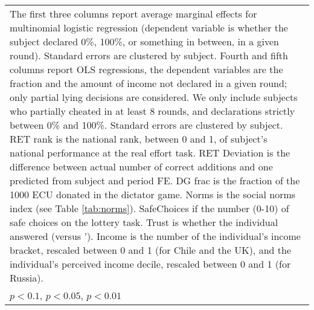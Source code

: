\begin{tabular}{l|cccccc|cc|cc}
\multicolumn{11}{p{18cm}}{\tiny The first three columns report average marginal effects for multinomial logistic regression (dependent variable is whether the subject declared 0\%, 100\%, or something in between, in a given round). Standard errors are clustered by subject. Fourth and fifth columns report OLS regressions, the dependent variables are the fraction and the amount of income not declared in a given round; only partial lying decisions are considered. We only include subjects who partially cheated in at least 8 rounds, and declarations strictly between 0\% and 100\%. Standard errors are clustered by subject. RET rank is the national rank, between 0 and 1, of subject's national performance at the real effort task. RET Deviation is the difference between actual number of correct additions and one predicted from subject and period FE. DG frac is the fraction of the 1000 ECU donated in the dictator game. Norms is the social norms index (see Table \ref{tab:norms}). SafeChoices if the number (0-10) of safe choices on the lottery task. Trust is whether the individual answered  (versus '). Income is the number of the individual's income bracket, rescaled between 0 and 1 (for Chile and the UK), and the individual's perceived income decile, rescaled between 0 and 1 (for Russia).}\\
\multicolumn{11}{l}{\tiny \sym{*} \(p<0.1\), \sym{**} \(p<0.05\), \sym{***} \(p<0.01\)}\\
\end{tabular}